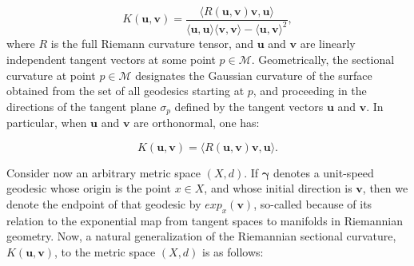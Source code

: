 \documentclass{article}
\begin{document}
\begin{equation}
K \left( \mathbf{u}, \mathbf{v} \right) = \frac{\langle R \left( \mathbf{u}, \mathbf{v} \right) \mathbf{v}, \mathbf{u} \rangle}{\langle \mathbf{u}, \mathbf{u} \rangle \langle \mathbf{v}, \mathbf{v} \rangle - \langle \mathbf{u}, \mathbf{v} \rangle^2},
\end{equation}
where $R$ is the full Riemann curvature tensor, and ${\mathbf{u}}$ and ${\mathbf{v}}$ are linearly independent tangent vectors at some point ${p \in \mathcal{M}}$. Geometrically, the sectional curvature at point ${p \in \mathcal{M}}$ designates the Gaussian curvature of the surface obtained from the set of all geodesics starting at $p$, and proceeding in the directions of the tangent plane ${\sigma_p}$ defined by the tangent vectors ${\mathbf{u}}$ and ${\mathbf{v}}$. In particular, when ${\mathbf{u}}$ and ${\mathbf{v}}$ are orthonormal, one has:

\begin{equation}
K \left( \mathbf{u}, \mathbf{v} \right) = \langle R \left( \mathbf{u}, \mathbf{v} \right) \mathbf{v}, \mathbf{u} \rangle.
\end{equation}

Consider now an arbitrary metric space ${\left( X, d \right)}$. If ${\boldsymbol\gamma}$ denotes a unit-speed geodesic whose origin is the point ${x \in X}$, and whose initial direction is ${\mathbf{v}}$, then we denote the endpoint of that geodesic by ${exp_x \left( \mathbf{v} \right)}$, so-called because of its relation to the exponential map from tangent spaces to manifolds in Riemannian geometry. Now, a natural generalization of the Riemannian sectional curvature, ${K \left( \mathbf{u}, \mathbf{v} \right)}$, to the metric space ${\left( X, d \right)}$ is as follows:
\end{document}
